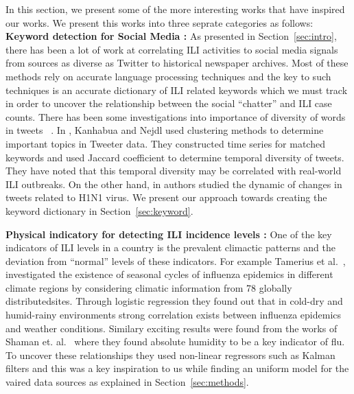 In this section, we present some of the more interesting works that have
inspired our works. We present this works into three seprate categories as follows: \\

\textbf{Keyword detection for Social Media :} 
As presented in Section~\ref{sec:intro}, there has been a lot of 
work at correlating ILI activities to social media signals from sources as diverse 
as Twitter to historical newspaper archives. Most of these methods rely on 
accurate language processing techniques and the key to such techniques is an 
accurate dictionary of ILI related keywords which we must track in order to 
uncover the relationship between the social ``chatter'' and ILI case counts. 
There has been some investigations into importance of diversity of words
in tweets ~\cite{ref5, ref6}. In
\cite{ref5}, Kanhabua and Nejdl used clustering methods to determine
important topics in Tweeter data. They constructed time series for
matched keywords and used Jaccard coefficient to determine temporal
diversity of tweets. They have noted that this temporal diversity may be
correlated with real-world ILI outbreaks. On the other hand, in \cite{ref6}
authors studied the dynamic of changes in tweets related to H1N1 virus. We 
present our approach towards creating the keyword dictionary in Section~\ref{sec:keyword}.

\textbf{ Physical indicatory for detecting ILI incidence levels :} 
One of the key indicators of ILI levels in a country is the prevalent 
climactic patterns and the deviation from ``normal'' levels of these 
indicators. For example Tamerius et al.~\cite{ref9}, investigated the existence of seasonal 
cycles of influenza epidemics in different climate regions
by considering
climatic information from 78 globally distributedsites. Through logistic
regression they found out that in cold-dry and humid-rainy
environments strong correlation exists between influenza epidemics and
weather conditions. Similary exciting results were found from the works
of Shaman et. al.~\cite{Shaman_orig_humidity_link, Shaman_humidity_USA}
where they found absolute humidity to be a key indicator of flu. To uncover 
these relationships they used non-linear regressors such as Kalman filters 
and this was a key inspiration to us while finding an uniform model for the
vaired data sources as explained in Section~\ref{sec:methods}.


